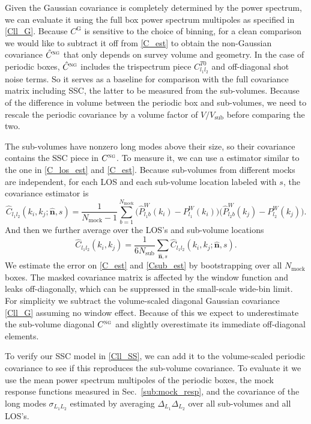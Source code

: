 \documentclass[a4paper,11pt]{article}
\newcommand{\los}{{\hat{\mathbf{n}}}}
\newcommand{\mock}{\mathrm{mock}}
\newcommand{\sub}{\mathrm{sub}}
\newcommand{\Gauss}{\mathrm{G}}
\newcommand{\nonGauss}{\textsc{ng}}
\begin{document}
Given the Gaussian covariance is completely determined by the power spectrum,
we can evaluate it using the full box power spectrum multipoles as specified in
\eqref{Cll_G}.
Because $C^\Gauss$ is sensitive to the choice of binning, for a clean
comparison we would like to subtract it off from \eqref{C_est} to obtain the
non-Gaussian covariance $\hat C^\nonGauss$ that only depends on survey volume
and geometry.
In the case of periodic boxes, $\hat C^\nonGauss$ includes the trispectrum
piece $C^{T0}_{l_1l_2}$ and off-diagonal shot noise terms.
So it serves as a baseline for comparison with the full covariance matrix
including SSC, the latter to be measured from the sub-volumes.
Because of the difference in volume between the periodic box and sub-volumes,
we need to rescale the periodic covariance by a volume factor of $V/V_\sub$
before comparing the two.

The sub-volumes have nonzero long modes above their size, so their covariance
contains the SSC piece in $C^\nonGauss$.
To measure it, we can use a estimator similar to the one in \eqref{C_los_est}
and \eqref{C_est}.
Because sub-volumes from different mocks are independent, for each LOS and each
sub-volume location labeled with $s$, the covariance estimator is
\begin{equation}
    \label{Csub_los_est}
    \hat C_{l_1l_2}(k_i,k_j;\los,s) =
    \frac1{N_\mock-1}\sum_{b=1}^{N_\mock}
    \bigl(\hat P^W_{l_1b}(k_i)-P^W_{l_1}(k_i)\bigr)
    \bigl(\hat P^W_{l_2b}(k_j)-P^W_{l_2}(k_j)\bigr).
\end{equation}
And then we further average over the LOS's and sub-volume locations
\begin{equation}
    \label{Csub_est}
    \hat C_{l_1l_2}(k_i,k_j)
    = \frac1{6N_\sub} \sum_{\los,s} \hat C_{l_1l_2}(k_i,k_j;\los,s).
\end{equation}
We estimate the error on \eqref{C_est} and \eqref{Csub_est} by bootstrapping
over all $N_\mock$ boxes.
The masked covariance matrix is affected by the window function and leaks
off-diagonally, which can be suppressed in the small-scale wide-bin limit.
For simplicity we subtract the volume-scaled diagonal Gaussian covariance
\eqref{Cll_G} assuming no window effect.
Because of this we expect to underestimate the sub-volume diagonal
$C^\nonGauss$ and slightly overestimate its immediate off-diagonal elements.

To verify our SSC model in \eqref{Cll_SS}, we can add it to the volume-scaled
periodic covariance to see if this reproduces the sub-volume covariance.
To evaluate it we use the mean power spectrum multipoles of the periodic boxes,
the mock response functions measured in Sec.~\ref{sub:mock_resp}, and the
covariance of the long modes $\sigma_{L_1L_2}$ estimated by averaging
$\Delta_{L_1}\Delta_{L_2}$ over all sub-volumes and all LOS's.
\end{document}
